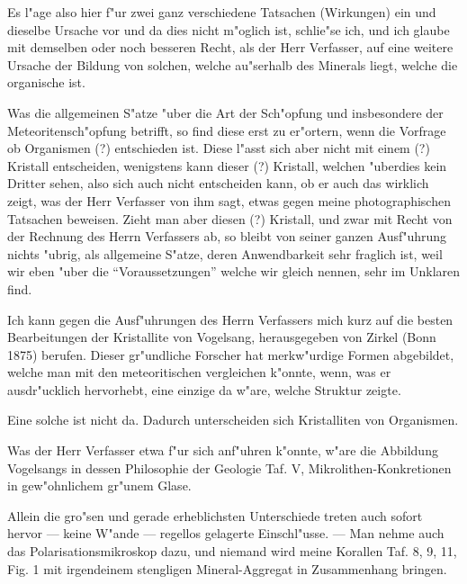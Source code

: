 \documentclass[a4paper, 12pt, oneside]{article}
\begin{document}
Es l"age also hier f"ur zwei ganz verschiedene Tatsachen (Wirkungen) ein und dieselbe Ursache vor und da dies nicht m"oglich ist, schlie"se ich, und ich glaube mit demselben oder noch besseren Recht, als der Herr Verfasser, auf eine weitere Ursache der Bildung von solchen, welche au"serhalb des Minerals liegt, welche die organische ist.

Was die allgemeinen S"atze "uber die Art der Sch"opfung und insbesondere der Meteoritensch"opfung betrifft, so find diese erst zu er"ortern, wenn die Vorfrage ob Organismen (?) entschieden ist. Diese l"asst sich aber nicht mit einem (?) Kristall entscheiden, wenigstens kann dieser (?) Kristall, welchen "uberdies kein Dritter sehen, also sich auch nicht entscheiden kann, ob er auch das wirklich zeigt, was der Herr Verfasser von ihm sagt, etwas gegen meine photographischen Tatsachen beweisen. Zieht man aber diesen (?) Kristall, und zwar mit Recht von der Rechnung des Herrn Verfassers ab, so bleibt von seiner ganzen Ausf"uhrung nichts "ubrig, als allgemeine S"atze, deren Anwendbarkeit sehr fraglich ist, weil wir eben "uber die "`Voraussetzungen"' welche wir gleich nennen, sehr im Unklaren find.

Ich kann gegen die Ausf"uhrungen des Herrn Verfassers mich kurz auf die besten Bearbeitungen der Kristallite von Vogelsang, herausgegeben von Zirkel (Bonn 1875) berufen. Dieser gr"undliche Forscher hat merkw"urdige Formen abgebildet, welche man mit den meteoritischen vergleichen k"onnte, wenn, was er ausdr"ucklich hervorhebt, eine einzige da w"are, welche Struktur zeigte.

Eine solche ist nicht da. Dadurch unterscheiden sich Kristalliten von Organismen.

Was der Herr Verfasser etwa f"ur sich anf"uhren k"onnte, w"are die Abbildung Vogelsangs in dessen Philosophie der Geologie Taf. V, Mikrolithen-Konkretionen in gew"ohnlichem gr"unem Glase.

Allein die gro"sen und gerade erheblichsten Unterschiede treten auch sofort hervor --- keine W"ande --- regellos gelagerte Einschl"usse. --- Man nehme auch das Polarisationsmikroskop dazu, und niemand wird meine Korallen Taf. 8, 9, 11, Fig. 1 mit irgendeinem stengligen Mineral-Aggregat in Zusammenhang bringen.
\end{document}
